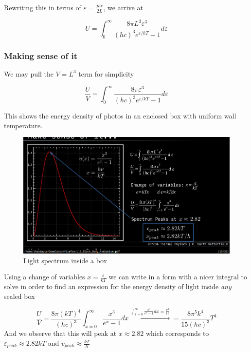 \documentclass[10pt]{article}
\begin{document}
Rewriting this in terms of $ \varepsilon = \frac{jhc}{2L} $, we arrive at

\begin{equation}
	U = \int_{0}^{\infty}   \frac{8\pi L^3 \varepsilon^3}{(hc)^3 e^{\varepsilon /kT} - 1} d\varepsilon
\end{equation}


\subsubsection{Making sense of it}

We may pull the $ V = L^3 $ term for simplicity

\begin{equation}
	\frac{U}{V} = \int_{0}^{\infty}   \frac{8\pi \varepsilon^3}{(hc)^3 e^{\varepsilon /kT} - 1} d\varepsilon
	\label{eq:294:l15_box_example}
\end{equation}

This shows the energy density of photos in an enclosed box with uniform wall temperature.

\begin{figure}[H]
	\centering
	\includegraphics[width=0.8\linewidth]{img/image_2022-04-09-02-15-12.png}
	\caption{Light spectrum inside a box}
\end{figure}

Using a change of variables $ x = \frac{\varepsilon}{kT} $ we can write in a form with a nicer integral to solve in order to find an expression for the energy density of light inside \textit{any} sealed box

\begin{equation}
	\frac{U}{V} = \frac{8\pi(kT)^4}{(hc)^3} \int^\infty_{x=0} \frac{x^3}{e^x - 1}dx \xrightarrow{\int^\infty_{x=0} \frac{x^3}{e^x -1}dx = \frac{\pi^4}{15}}  = \frac{8\pi^5k^4}{15(hc)^3}T^4
	\label{eq:294:energy_density_uniform_box_wall}
\end{equation}
And we observe that this will peak at $ x \approx 2.82 $ which corresponds to $ \varepsilon_{peak}  \approx 2.82 kT $ and $ v_{peak} \approx \frac{kT}{h}  $ 
\end{document}
